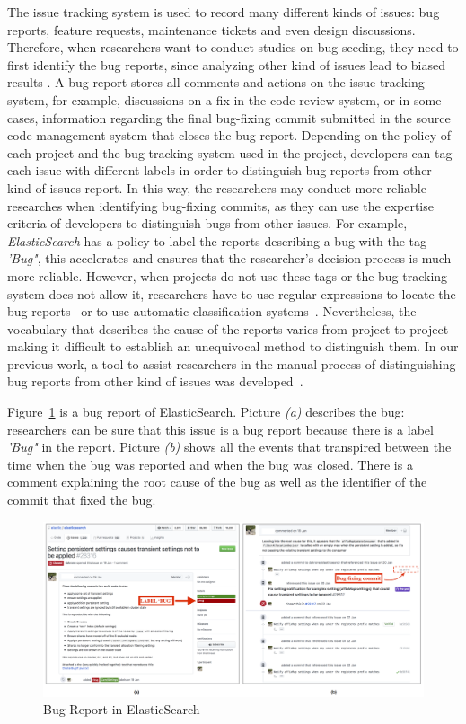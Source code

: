 \documentclass[a4paper, 12pt]{book}
\begin{document}
The issue tracking system is used to record many different kinds of issues: bug reports, feature requests, maintenance tickets and even design discussions. Therefore, when researchers want to conduct studies on bug seeding, they need to first identify the bug reports, since analyzing other kind of issues lead to biased results \cite{bird2009fair}. A bug report stores all comments and actions on the issue tracking system, for example, discussions on a fix in the code review system, or in some cases, information regarding the final bug-fixing commit submitted in the source code management system that closes the bug report. Depending on the policy of each project and the bug tracking system used in the project, developers can tag each issue with different labels in order to distinguish bug reports from other kind of issues report. In this way, the researchers may conduct more reliable researches when identifying bug-fixing commits, as they can use the expertise criteria of developers to distinguish bugs from other issues. For example, \emph{ElasticSearch} has a policy to label the reports describing a bug with the tag \emph{'Bug"}, this accelerates and ensures that the researcher's decision process is much more reliable. However, when projects do not use these tags or the bug tracking system does not allow it, researchers have to use regular expressions to locate the bug reports~\cite{sliwerski2005changes} or to use automatic classification systems~\cite{antoniol2008bug}. Nevertheless, the vocabulary that describes the cause of the reports varies from project to project making it difficult to establish an unequivocal method to distinguish them. In our previous work,  a tool to assist researchers in the manual process of distinguishing bug reports from other kind of issues was developed~\cite{rodriguez2016bugtracking}.

Figure~\ref{fig:bugreport} is a bug report of ElasticSearch. Picture \emph{(a)} describes the bug: researchers can be sure that this issue is a bug report because there is a label \emph{'Bug"} in the report. Picture \emph{(b)} shows all the events that transpired between the time when the bug was reported and when the bug was closed. There is a comment explaining the root cause of the bug as well as the identifier of the commit that fixed the bug.

\begin{figure}[ht]
\centering
\includegraphics[width=\columnwidth]{img/bugreport.png}
\caption{Bug Report in ElasticSearch}
\label{fig:bugreport}       %
\end{figure}
\end{document}
